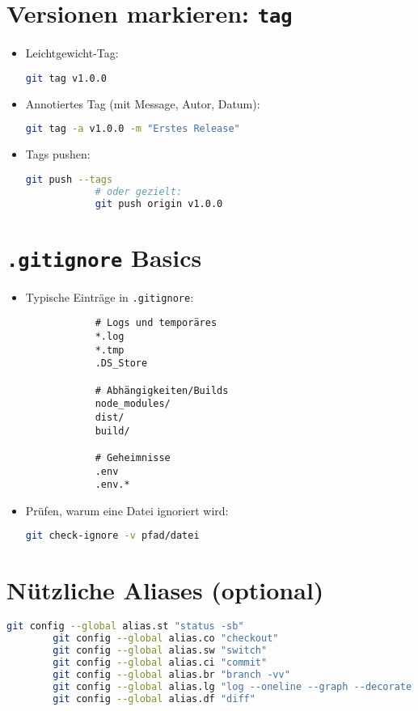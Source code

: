 \documentclass[a4paper,11pt]{article}
\begin{document}
	\section{Versionen markieren: \texttt{tag}}
	\begin{itemize}
		\item Leichtgewicht-Tag:
		\begin{lstlisting}[language=bash]
			git tag v1.0.0
		\end{lstlisting}
		\item Annotiertes Tag (mit Message, Autor, Datum):
		\begin{lstlisting}[language=bash]
			git tag -a v1.0.0 -m "Erstes Release"
		\end{lstlisting}
		\item Tags pushen:
		\begin{lstlisting}[language=bash]
			git push --tags
			# oder gezielt:
			git push origin v1.0.0
		\end{lstlisting}
	\end{itemize}
	
	\section{\texttt{.gitignore} Basics}
	\begin{itemize}
		\item Typische Eintr\"age in \texttt{.gitignore}:
		\begin{lstlisting}
			# Logs und temporäres
			*.log
			*.tmp
			.DS_Store
			
			# Abhängigkeiten/Builds
			node_modules/
			dist/
			build/
			
			# Geheimnisse
			.env
			.env.*
		\end{lstlisting}
		\item Pr\"ufen, warum eine Datei ignoriert wird:
		\begin{lstlisting}[language=bash]
			git check-ignore -v pfad/datei
		\end{lstlisting}
	\end{itemize}
	
	\section{N\"utzliche Aliases (optional)}
	\begin{lstlisting}[language=bash]
		git config --global alias.st "status -sb"
		git config --global alias.co "checkout"
		git config --global alias.sw "switch"
		git config --global alias.ci "commit"
		git config --global alias.br "branch -vv"
		git config --global alias.lg "log --oneline --graph --decorate --all"
		git config --global alias.df "diff"
	\end{lstlisting}
	
\end{document}
